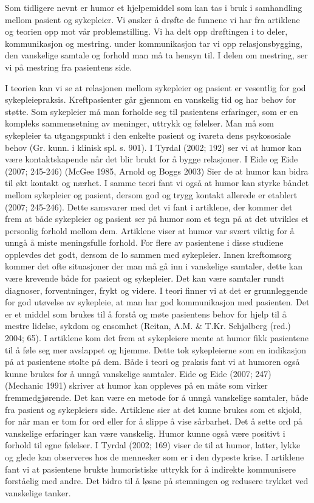 Som tidligere nevnt er humor et hjelpemiddel som kan tas i bruk i samhandling
mellom pasient og sykepleier. Vi ønsker å drøfte de funnene vi har fra
artiklene og teorien opp mot vår problemstilling. Vi ha delt opp drøftingen i
to deler, kommunikasjon og mestring. under kommunikasjon tar vi opp
relasjonsbygging, den vanskelige samtale og forhold man må ta hensyn til. I
delen om mestring, ser vi på mestring fra pasientens side.

I teorien kan vi se at relasjonen mellom sykepleier og pasient er vesentlig for
god sykepleiepraksis. Kreftpasienter går gjennom en vanskelig tid og har behov
for støtte. Som sykepleier må man forholde seg til pasientens erfaringer, som
er en kompleks sammensetning av meninger, uttrykk og følelser. Man må som
sykepleier ta utgangspunkt i den enkelte pasient og ivareta dens psykososiale
behov (Gr. kunn. i klinisk spl. s. 901). I Tyrdal (2002; 192) ser vi at humor
kan være kontaktskapende når det blir brukt for å bygge relasjoner. I Eide og
Eide (2007; 245-246) (McGee 1985, Arnold og Boggs 2003) Sier de at humor kan
bidra til økt kontakt og nærhet. I samme teori fant vi også at humor kan styrke
båndet mellom sykepleier og pasient, dersom god og trygg kontakt allerede er
etablert (2007; 245-246). Dette samsvarer med det vi fant i artiklene, der
kommer det frem at både sykepleier og pasient ser på humor som et tegn på at
det utvikles et personlig forhold mellom dem. Artiklene viser at humor var
svært viktig for å unngå å miste meningsfulle forhold. For flere av pasientene
i disse studiene opplevdes det godt, dersom de lo sammen med sykepleier.  Innen
kreftomsorg kommer det ofte situasjoner der man må gå inn i vanskelige
samtaler, dette kan være krevende både for pasient og sykepleier. Det kan være
samtaler rundt diagnoser, forventninger, frykt og videre. I teori finner vi at
det er grunnleggende for god utøvelse av sykepleie, at man har god
kommunikasjon med pasienten. Det er et middel som brukes til å forstå og møte
pasientens behov for hjelp til å mestre lidelse, sykdom og ensomhet (Reitan,
A.M. \&{} T.Kr. Schjølberg (red.) 2004; 65). I artiklene kom det frem at
sykepleiere mente at humor fikk pasientene til å føle seg mer avslappet og
hjemme. Dette tok sykepleierne som en indikasjon på at pasientene stolte på
dem. Både i teori og praksis fant vi at humoren også kunne brukes for å unngå
vanskelige samtaler. Eide og Eide (2007; 247) (Mechanic 1991) skriver at humor
kan oppleves på en måte som virker fremmedgjørende. Det kan være en metode for
å unngå vanskelige samtaler, både fra pasient og sykepleiers side. Artiklene
sier at det kunne brukes som et skjold, for når man er tom for ord eller for å
slippe å vise sårbarhet. Det å sette ord på vanskelige erfaringer kan være
vanskelig. Humor kunne også være positivt i forhold til egne følelser. I Tyrdal
(2002; 169) viser de til at humor, latter, lykke og glede kan observeres hos de
mennesker som er i den dypeste krise. I artiklene fant vi at pasientene brukte
humoristiske uttrykk for å indirekte kommunisere forståelig med andre. Det
bidro til å løsne på stemningen og redusere trykket ved vanskelige tanker.


